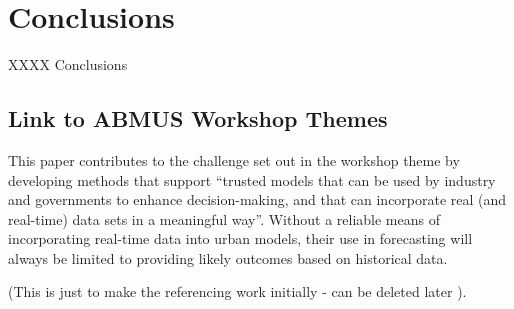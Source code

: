 \documentclass[runningheads]{llncs}
\begin{document}


%
%
%
%
\section{Conclusions}

XXXX Conclusions

\subsection*{Link to ABMUS Workshop Themes}

This paper contributes to the challenge set out in the workshop theme by developing methods that support ``trusted models that can be used by industry and governments to enhance decision-making, and that can incorporate real (and real-time) data sets in a meaningful way''. Without a reliable means of incorporating real-time data into urban models, their use in forecasting will always be limited to providing likely outcomes based on historical data.

(This is just to make the referencing work initially - can be deleted later \cite{epstein_growing_1996} ).




\end{document}
